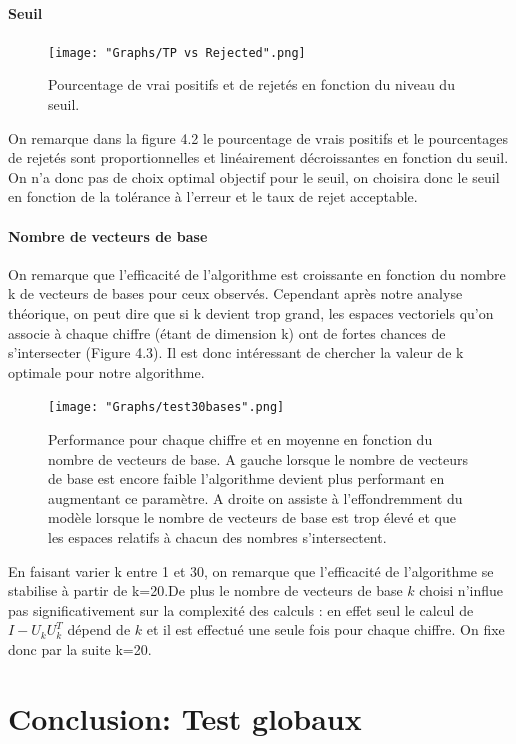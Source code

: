 \documentclass[a4paper,11pt,twoside]{report}
\begin{document}
\subsubsection{Seuil}

\begin{figure}[H]
  	\texttt{[image: "Graphs/TP vs Rejected".png]}
  	\caption{Pourcentage de vrai positifs et de rejetés en fonction du niveau du seuil.}
\end{figure}

On remarque dans la figure 4.2 le pourcentage de vrais positifs et le pourcentages de rejetés sont proportionnelles et linéairement décroissantes en fonction du seuil. On n'a donc pas de choix optimal objectif pour le seuil, on choisira donc le seuil en fonction de la tolérance à l'erreur et le taux de rejet acceptable. 

\subsubsection{Nombre de vecteurs de base}
On remarque que l'efficacité de l'algorithme est croissante en fonction du nombre k de vecteurs de bases pour ceux observés. Cependant après notre analyse théorique, on peut dire que si k devient trop grand, les espaces vectoriels qu'on associe à chaque chiffre (étant de dimension k) ont de fortes chances de s'intersecter (Figure 4.3). Il est donc intéressant de chercher la valeur de k optimale pour notre algorithme.

\begin{figure}[H]
  	\texttt{[image: "Graphs/test30bases".png]}
  	\caption{Performance pour chaque chiffre et en moyenne en fonction du nombre de vecteurs de base. A gauche lorsque le nombre de vecteurs de base est encore faible l'algorithme devient plus performant en augmentant ce paramètre. A droite on assiste à l'effondremment du modèle lorsque le nombre de vecteurs de base est trop élevé et que les espaces relatifs à chacun des nombres s'intersectent.}
\end{figure}

En faisant varier k entre 1 et 30, on remarque que l'efficacité de l'algorithme se stabilise à partir de k=20.De plus le nombre de vecteurs de base $k$ choisi n'influe pas significativement sur la complexité des calculs : en effet seul le calcul de $I-U_{k}U_{k}^{T}$ dépend de $k$ et il est effectué une seule fois pour chaque chiffre. On fixe donc par la suite k=20.

\chapter{Conclusion: Test globaux}
\end{document}
